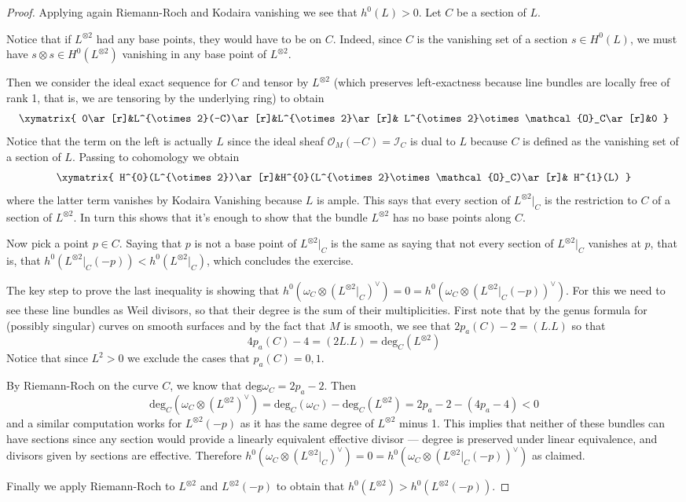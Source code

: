 \documentclass{book}
\begin{document}
\begin{proof}
Applying again Riemann-Roch and Kodaira
vanishing we see that $h^0(L)>0$. Let $C$ be
a section of $L$.

Notice that if $L^{\otimes 2}$ had any base
points, they would have to be on $C$. Indeed,
since $C$ is the vanishing set of a section
$s\in H^{0}(L)$, we must have $s \otimes s
\in H^{0}(L^{\otimes 2})$ vanishing in any
base point of $L^{\otimes 2}$.

Then we consider the ideal exact sequence for
$C$ and tensor by $L^{\otimes 2}$ (which
preserves left-exactness because line bundles
are locally free of rank 1, that is, we are
tensoring by the underlying ring) to obtain
$$ \xymatrix{ 0\ar[r]&L^{\otimes
2}(-C)\ar[r]&L^{\otimes 2}\ar[r]& L^{\otimes
2}\otimes\mathcal{O}_C\ar[r]&0 } $$ Notice
that the term on the left is actually $L$
since the ideal sheaf
$\mathcal{O}_M(-C)=\mathcal{I}_C$ is dual to
$L$ because $C$ is defined as the vanishing
set of a section of $L$. Passing to
cohomology we obtain $$ \xymatrix{
H^{0}(L^{\otimes 2})\ar[r]&H^{0}(L^{\otimes
2}\otimes \mathcal{O}_C)\ar[r]& H^{1}(L) } $$
where the latter term vanishes by Kodaira
Vanishing because $L$ is ample. This says
that every section of $L^{\otimes 2}|_C$ is
the restriction to $C$ of a section of
$L^{\otimes 2}$. In turn this shows that it's
enough to show that the bundle $L^{\otimes
2}$ has no base points along $C$.

Now pick a point $p\in C$. Saying
that $p$ is not a base point of $L^{\otimes
2}|_{C}$ is the same as saying that not every
section of $L^{\otimes 2}|_{C}$ vanishes at
$p$, that is, that $h^0(L^{\otimes
2}|_{C}(-p))<h^0(L^{\otimes 2}|_{C})$,
which concludes the exercise.

The key step to prove
the last inequality is showing that
$h^0(\omega_C\otimes(L^{\otimes2}|_{C})^\vee)
=0=h^0(\omega_C\otimes
(L^{\otimes2}|_{C}(-p))^\vee)$. For this we
need to see these line bundles as Weil
divisors, so that their degree is the sum of
their multiplicities. First note that by the
genus formula for (possibly singular) curves
on smooth surfaces and by the fact that $M$
is smooth, we see that $2p_a(C)-2=(L.L)$ so
that
$$
4p_a(C)-4=(2L.L)=\text{deg}_C(L^{\otimes 2})
$$
Notice that since $L^2>0$ we exclude the
cases that $p_a(C)=0,1$.

By Riemann-Roch on the curve
$C$, we know that
$\text{deg}\omega_C=2p_a-2$. Then
$$
\text{deg}_C
(\omega_C\otimes (L^{\otimes2})^\vee)
=\text{deg}_C(\omega_C)-\text{deg}
_C(L^{\otimes
2})
=2p_a-2-(4p_a-4)<0
$$
and a similar computation works for
$L^{\otimes 2}(-p)$ as it has the same
degree of $L^{\otimes 2}$ minus 1. This
implies that neither of these bundles
can have sections since any section would
provide a linearly equivalent
effective divisor
--- degree is preserved under linear
equivalence,
and divisors given by sections are effective.
Therefore
$h^0(\omega_C\otimes
(L^{\otimes2}|_{C})^\vee)=0
=h^0(\omega_C\otimes (L^{\otimes
2}|_{C}(-p))^\vee)$ as claimed.

Finally we apply Riemann-Roch to $L^{\otimes
2}$ and $L^{\otimes 2}(-p)$ to
obtain that $h^0(L^{\otimes
2})>h^0(L^{\otimes 2}(-p))$.
\end{proof}
\end{document}
